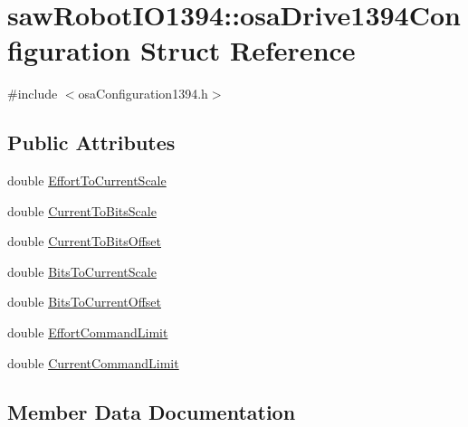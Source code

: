 \hypertarget{structsaw_robot_i_o1394_1_1osa_drive1394_configuration}{}\section{saw\+Robot\+I\+O1394\+:\+:osa\+Drive1394\+Configuration Struct Reference}
\label{structsaw_robot_i_o1394_1_1osa_drive1394_configuration}


{\ttfamily \#include $<$osa\+Configuration1394.\+h$>$}

\subsection*{Public Attributes}
\begin{DoxyCompactItemize}
\item 
double \hyperlink{structsaw_robot_i_o1394_1_1osa_drive1394_configuration_a8b80905fd42053724c4472214064331d}{Effort\+To\+Current\+Scale}
\item 
double \hyperlink{structsaw_robot_i_o1394_1_1osa_drive1394_configuration_ae9da5e24c71fa90f765cbf0e4730c537}{Current\+To\+Bits\+Scale}
\item 
double \hyperlink{structsaw_robot_i_o1394_1_1osa_drive1394_configuration_ae18ff75e3c9fcb191a167a69e0777f90}{Current\+To\+Bits\+Offset}
\item 
double \hyperlink{structsaw_robot_i_o1394_1_1osa_drive1394_configuration_a6fe0e511700198357e1ef4438e5dcba8}{Bits\+To\+Current\+Scale}
\item 
double \hyperlink{structsaw_robot_i_o1394_1_1osa_drive1394_configuration_a80f8cb255c165a39f998af0121a3350b}{Bits\+To\+Current\+Offset}
\item 
double \hyperlink{structsaw_robot_i_o1394_1_1osa_drive1394_configuration_afe9ad251c2277276b92d1eb828281858}{Effort\+Command\+Limit}
\item 
double \hyperlink{structsaw_robot_i_o1394_1_1osa_drive1394_configuration_adfb9b1bf722a0e9f5e92fa6183118902}{Current\+Command\+Limit}
\end{DoxyCompactItemize}


\subsection{Member Data Documentation}
\hypertarget{structsaw_robot_i_o1394_1_1osa_drive1394_configuration_a80f8cb255c165a39f998af0121a3350b}{}
